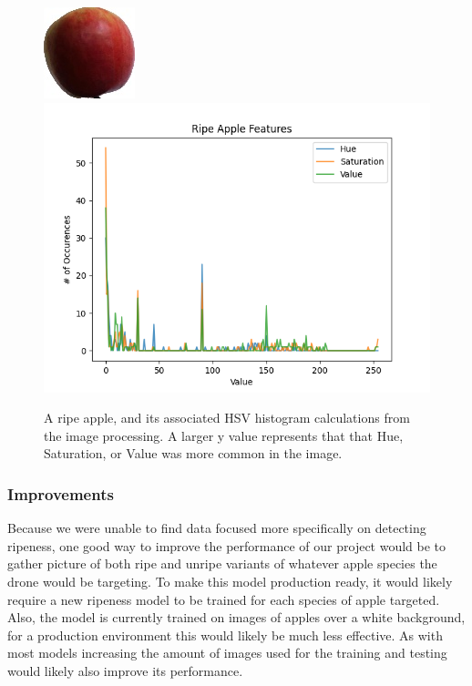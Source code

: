 \begin{figure}[!htb]
    \fontsize{7}{5}\selectfont
    \centering
    \includegraphics[scale=0.7]
    {figures/Ripe Apple Example}
    \includegraphics[scale=.5]
    {figures/ripeness_features}
    \caption{
        A ripe apple, and its associated HSV histogram calculations from the image
        processing. A larger y value represents that that Hue, Saturation, or Value
        was more common in the image.
    }
    \label{fig:ripe-apple-example}
\end{figure}

\subsubsection{Improvements}
Because we were unable to find data focused more specifically on detecting ripeness,
one good way to improve the performance of our project would be to gather picture of
both ripe and unripe variants of
whatever apple species the drone would be targeting.
To make this model production ready, it would likely require a new ripeness model to
be trained for each species of apple targeted.
Also, the model is currently trained on images of apples over a white background, for
a production environment this would likely be much less effective.
As with most models increasing the amount of images used for the training and testing
would likely also improve its performance.
